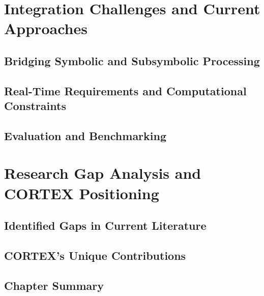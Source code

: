 \section{Integration Challenges and Current Approaches}

\subsection{Bridging Symbolic and Subsymbolic Processing}

\subsection{Real-Time Requirements and Computational Constraints}

\subsection{Evaluation and Benchmarking}

\section{Research Gap Analysis and CORTEX Positioning}

\subsection{Identified Gaps in Current Literature}

\subsection{CORTEX's Unique Contributions}

\subsection{Chapter Summary}

